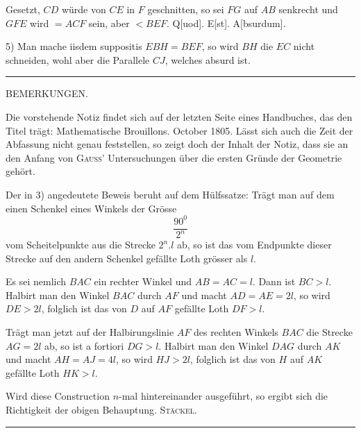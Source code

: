 Gesetzt, $CD$ würde von $CE$ in $F$ geschnitten, so sei $FG$ auf $AB$ senkrecht
und $GFE$ wird $= ACF$ sein, aber $< BEF$. Q[uod]. E[st]. A[bsurdum].

5) Man mache iisdem suppositis $EBH = BEF$, so wird $BH$ die $EC$
nicht schneiden, wohl aber die Parallele $CJ$, welches absurd ist.

\bigskip
\hrule
\bigskip

\begin{center}BEMERKUNGEN.\end{center}

\smallskip

Die vorstehende Notiz findet sich auf der letzten Seite eines Handbuches, das den Titel trägt: Mathematische Brouillons. October 1805. Lässt sich auch die Zeit der Abfassung nicht genau feststellen, so zeigt doch der Inhalt der Notiz, dass sie an den Anfang von \textsc{Gauss}’ Untersuchungen über die ersten Gründe der Geometrie gehört.

Der in 3) angedeutete Beweis beruht auf dem Hülfssatze: Trägt man auf dem einen Schenkel eines Winkels der Grösse
\[
\frac{90^{0}}{2^n}
\]
vom Scheitelpunkte aus die Strecke $2^n.l$ ab, so ist das vom Endpunkte dieser Strecke auf den andern Schenkel gefällte Loth grösser als $l$.

\begin{center}\end{center}

Es sei nemlich $BAC$ ein rechter Winkel und $AB = AC = l$. Dann ist $BC > l$. Halbirt man den Winkel $BAC$ durch $AF$ und macht $AD = AE = 2l$, so wird $DE > 2l$, folglich ist das von $D$ auf $AF$ gefällte Loth $DF > l$.

Trägt man jetzt auf der Halbirungslinie $AF$ des rechten Winkels $BAC$ die Strecke $AG = 2l$ ab, so ist a fortiori $DG > l$. Halbirt man den Winkel $DAG$ durch $AK$ und macht $AH = AJ = 4l$, so wird $HJ > 2l$, folglich ist das von $H$ auf $AK$ gefällte Loth $HK > l$.

Wird diese Construction $n$-mal hintereinander ausgeführt, so ergibt sich die Richtigkeit der obigen Behauptung.
\hfill \textsc{Stäckel}.

\bigskip
\hrule
